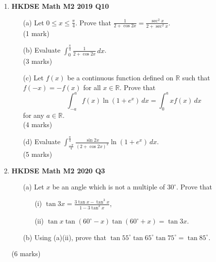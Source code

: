 \documentclass{report}
\begin{document}
\begin{enumerate}
	\item \textbf{HKDSE Math M2 2019 Q10}
	\begin{enumerate}
		\item [(a)] Let $0 \leq x \leq \displaystyle\frac{\pi}{4}$. Prove that $\displaystyle\frac{1}{2+\cos{2x}} = \frac{\sec^2{x}}{2+\sec^2{x}}$. \\(1 mark) 
		\item [(b)] Evaluate $\displaystyle \int_{0}^{ \tfrac{\pi}{4}} \frac{1}{2+\cos{2x}}\,dx$. \\(3 marks)
		\item [(c)] Let $f(x)$ be a continuous function defined on $\mathbb{R}$ such that $f(-x) = -f(x)$ for all $x \in \mathbb{R}$. Prove that $$\displaystyle\int_{-a}^{a} f(x)\ln{(1+e^x)}\,dx = \int_{0}^{a} xf(x)\,dx$$ for any $a \in \mathbb{R}  $. \\(4 marks)
		\item [(d)] Evaluate $\displaystyle \int_{\tfrac{-\pi}{4}}^{\tfrac{\pi}{4}}  \frac{\sin{2x}}{(2+\cos{2x})^2}\ln(1 + e^x)\,dx$. \\(5 marks)
	\end{enumerate}
	\item \textbf{HKDSE Math M2 2020 Q3}
	\begin{enumerate}
		\item [(a)] Let $x$ be an angle which is not a multiple of $30^\circ$. Prove that 
		\begin{enumerate}
			\item [(i)]$\tan{3x} = \displaystyle \frac{3\tan{x} - \tan^3{x}}{1-3\tan^2{x}}$, 
			\item [(ii)] $\tan{x} \tan(60^\circ - x)\tan(60^\circ + x) = \tan{3x}$. 
		\end{enumerate}
		\item [(b)] Using (a)(ii), prove that $\tan{55^\circ}\tan{65^\circ}\tan{75^\circ} = \tan{85^\circ}$.
	\end{enumerate}
	(6 marks)

	\newpage


\end{enumerate}
\end{document}
